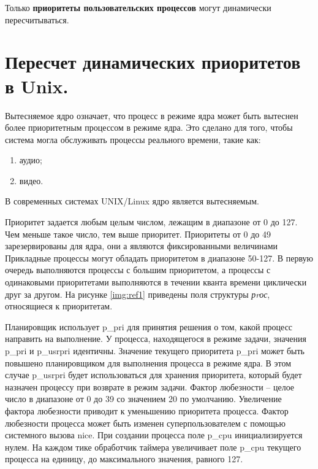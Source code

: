 Только \textbf{приоритеты пользовательских
	процессов} могут динамически пересчитываться.

\section{Пересчет динамических приоритетов в Unix.}

Вытесняемое ядро означает, что процесс в режиме ядра 
может быть вытеснен более приоритетным процессом в режиме ядра.
Это сделано для того, 
чтобы система могла обслуживать процессы реального времени,
такие как:

\begin{enumerate}
	\item аудио;
	\item видео.
\end{enumerate}

В современных системах UNIX/Linux ядро является вытесняемым.

Приоритет задается любым целым числом, лежащим в диапазоне от 0 до 127. 
Чем меньше такое число, тем выше приоритет. 
Приоритеты от 0 до 49 зарезервированы для ядра, они а являются фиксированными величинами
Прикладные процессы могут обладать приоритетом в диапазоне 50-127.
В первую очередь выполняются процессы с большим приоритетом,
а процессы с одинаковыми приоритетами выполняются в течении кванта
времени циклически друг за другом. 
На рисунке \ref{img:ref1} приведены поля структуры \textit{рrос},
относящиеся к приоритетам.

\begin{figure}[ht!]
\end{figure}

Планировщик использует p\_pri для принятия решения о том,
какой процесс направить на выполнение.
У процесса, находящегося в режиме задачи, значения p\_pri и p\_usrpri идентичны.
Значение текущего приоритета p\_pri может быть повышено планировщиком для выполнения процесса в режиме ядра. 
В этом случае p\_usrpri будет использоваться для хранения приоритета, который будет назначен процессу
при возврате в режим задачи. 
Фактор любезности – целое число в диапазоне от 0 до 39 со значением
20 по умолчанию. Увеличение фактора любезности приводит к уменьшению 
приоритета процесса. Фактор любезности процесса может быть
изменен суперпользователем с помощью системного вызова nice.
При создании процесса поле p\_cpu инициализируется нулем. 
На каждом тике обработчик 
таймера увеличивает поле p\_cpu текущего процесса на единицу,
до максимального значения, 
равного 127.

